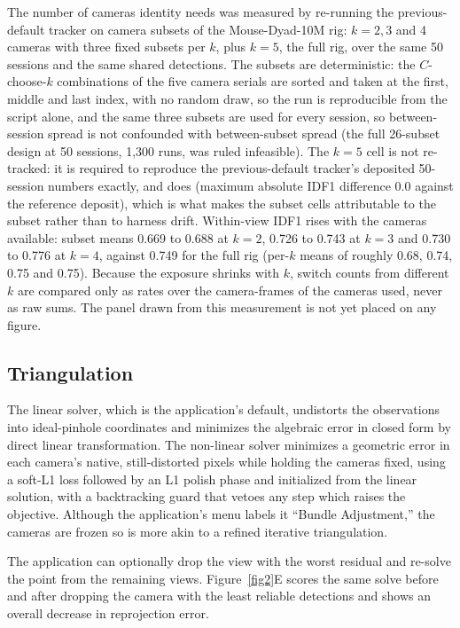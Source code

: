 \documentclass[pdflatex, sn-nature]{sn-jnl}
\theoremstyle{thmstyleone}%
\theoremstyle{thmstyletwo}%
\theoremstyle{thmstylethree}%
\begin{document}
The number of cameras identity needs was measured by re-running the previous-default tracker on camera subsets of the Mouse-Dyad-10M rig: $k = 2, 3$ and 4 cameras with three fixed subsets per $k$, plus $k = 5$, the full rig, over the same 50 sessions and the same shared detections. The subsets are deterministic: the $C$-choose-$k$ combinations of the five camera serials are sorted and taken at the first, middle and last index, with no random draw, so the run is reproducible from the script alone, and the same three subsets are used for every session, so between-session spread is not confounded with between-subset spread (the full 26-subset design at 50 sessions, 1,300 runs, was ruled infeasible). The $k = 5$ cell is not re-tracked: it is required to reproduce the previous-default tracker's deposited 50-session numbers exactly, and does (maximum absolute IDF1 difference 0.0 against the reference deposit), which is what makes the subset cells attributable to the subset rather than to harness drift. Within-view IDF1 rises with the cameras available: subset means 0.669 to 0.688 at $k = 2$, 0.726 to 0.743 at $k = 3$ and 0.730 to 0.776 at $k = 4$, against 0.749 for the full rig (per-$k$ means of roughly 0.68, 0.74, 0.75 and 0.75). Because the exposure shrinks with $k$, switch counts from different $k$ are compared only as rates over the camera-frames of the cameras used, never as raw sums. The panel drawn from this measurement is not yet placed on any figure.

\subsection{Triangulation}\label{methods-triangulation}

The linear solver, which is the application's default, undistorts the observations into ideal-pinhole coordinates and minimizes the algebraic error in closed form by direct linear transformation. The non-linear solver minimizes a geometric error in each camera's native, still-distorted pixels while holding the cameras fixed, using a soft-L1 loss followed by an L1 polish phase and initialized from the linear solution, with a backtracking guard that vetoes any step which raises the objective. Although the application's menu labels it ``Bundle Adjustment,'' the cameras are frozen so is more akin to a refined iterative triangulation. 

The application can optionally drop the view with the worst residual and re-solve the point from the remaining views. Figure~\ref{fig2}E scores the same solve before and after dropping the camera with the least reliable detections and shows an overall decrease in reprojection error. 
\end{document}
